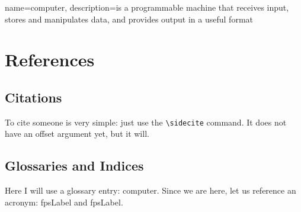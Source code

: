 {
  name=computer,
  description={is a programmable machine that receives input,
               stores and manipulates data, and provides
               output in a useful format}
}

\renewcommand*{\chapterformat}
{
  \enskip\mbox{\scalebox{4}{\thechapter\autodot}}
}
\renewcommand\chapterlinesformat[3]
{
  \parbox[b]{\textwidth}{\hrulefill#2}\par%
  #3%
  \parbox[b]{\textwidth+\marginparsep+\marginparwidth}{\hrulefill}%
}
\setchapterpreamble[u]{\margintoc}
\chapter{References}

\section{Citations}

To cite someone is very simple: just 
use the \verb|\sidecite| command. It does not have an offset argument 
yet, but it will.

\section{Glossaries and Indices}

Here I will use a glossary entry: \gls{computer}. Since we are here, let 
us reference an acronym: \acrfull{fpsLabel} and \acrshort{fpsLabel}.
